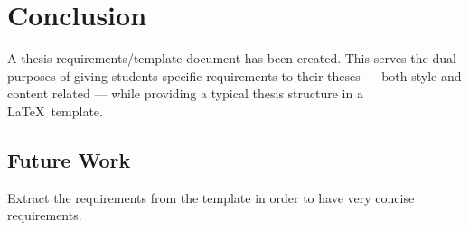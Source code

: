 \chapter{Conclusion}\label{ch:conclusion}

A thesis requirements/template document has been created.  This serves the
dual purposes of giving students specific requirements to their theses ---
both style and content related --- while providing a typical thesis
structure in a \LaTeX\ template.

\section{Future Work}

Extract the requirements from the template in order to have very concise
requirements.
